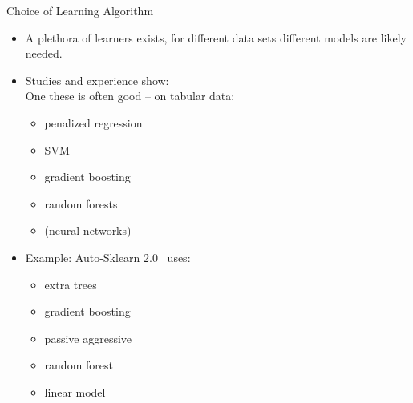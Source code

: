 \begin{frame}{Choice of Learning Algorithm}
  \begin{itemize}
    \item A plethora of learners exists, for different data sets different models
        are likely needed.

        
    \item Studies and experience show:\\

        One these is often good -- on tabular data:
    \begin{itemize}
      \item penalized regression
      \item SVM
      \item gradient boosting
       \item random forests
     \item (neural networks)
  \end{itemize}

      \item Example: Auto-Sklearn 2.0~ uses: 

    \begin{itemize}
        \item extra trees 
         \item gradient boosting 
         \item passive aggressive 
        \item random forest 
        \item linear model
  \end{itemize}
    \end{itemize}
\end{frame}

